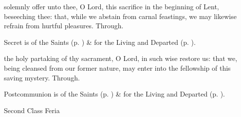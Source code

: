 \secret
{} solemnly offer unto thee, O Lord, this sacrifice in the beginning of Lent, beseeching thee: that, while we abstain from carnal feastings, we may likewise refrain from hurtful pleasures. Through.
\begin{rubric}
     Secret is of the Saints (p. \pageref{SPSaints}) \&  for the Living and Departed (p. \pageref{SPLivingDeparted}).
\end{rubric}
\postcommunion
{} the holy partaking of thy sacrament, O Lord, in such wise restore us: that we, being cleansed from our former nature, may enter into the fellowship of this saving mystery. Through.
\begin{rubric}
     Postcommunion is of the Saints (p. \pageref{SPSaints}) \&  for the Living and Departed (p. \pageref{SPLivingDeparted}).
\end{rubric}

\begin{inhead}
{Second Class Feria}
\end{inhead}

\properantiphonfix

